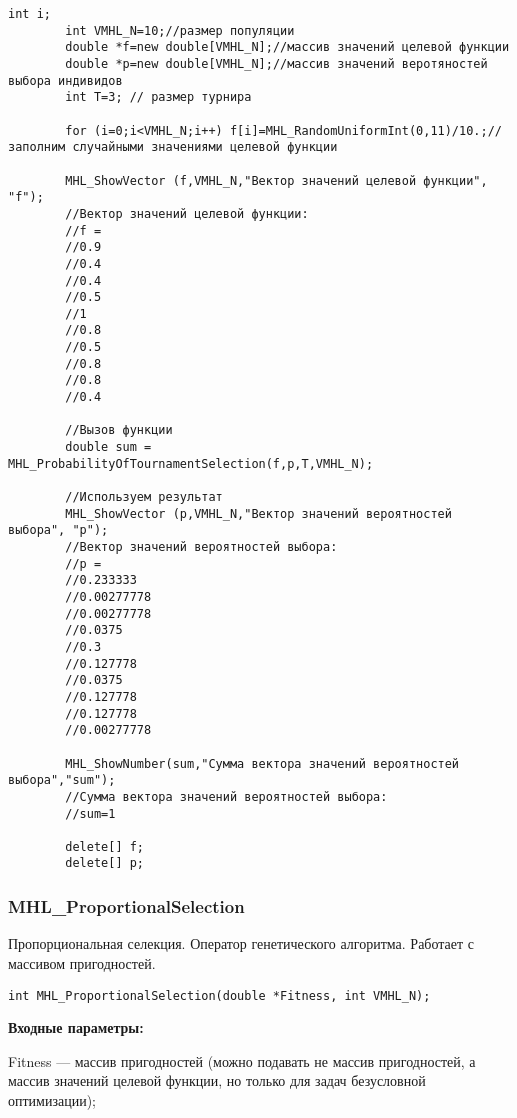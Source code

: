 \documentclass[a4paper,12pt]{article}
\begin{document}
\begin{lstlisting}[label=code_use_MHL_ProbabilityOfTournamentSelection,caption=Пример использования]
        int i;
        int VMHL_N=10;//размер популяции
        double *f=new double[VMHL_N];//массив значений целевой функции
        double *p=new double[VMHL_N];//массив значений веротяностей выбора индивидов
        int T=3; // размер турнира

        for (i=0;i<VMHL_N;i++) f[i]=MHL_RandomUniformInt(0,11)/10.;//заполним случайными значениями целевой функции

        MHL_ShowVector (f,VMHL_N,"Вектор значений целевой функции", "f");
        //Вектор значений целевой функции:
        //f =
        //0.9
        //0.4
        //0.4
        //0.5
        //1
        //0.8
        //0.5
        //0.8
        //0.8
        //0.4

        //Вызов функции
        double sum = MHL_ProbabilityOfTournamentSelection(f,p,T,VMHL_N);

        //Используем результат
        MHL_ShowVector (p,VMHL_N,"Вектор значений вероятностей выбора", "p");
        //Вектор значений вероятностей выбора:
        //p =
        //0.233333
        //0.00277778
        //0.00277778
        //0.0375
        //0.3
        //0.127778
        //0.0375
        //0.127778
        //0.127778
        //0.00277778

        MHL_ShowNumber(sum,"Сумма вектора значений вероятностей выбора","sum");
        //Сумма вектора значений вероятностей выбора:
        //sum=1

        delete[] f;
        delete[] p;
\end{lstlisting}

\subsubsection{MHL\_ProportionalSelection}\label{MHL_ProportionalSelection}

Пропорциональная селекция. Оператор генетического алгоритма. Работает с массивом пригодностей.


\begin{lstlisting}[label=code_syntax_MHL_ProportionalSelection,caption=Синтаксис]
int MHL_ProportionalSelection(double *Fitness, int VMHL_N);
\end{lstlisting}

\textbf{Входные параметры:}
 
 Fitness --- массив пригодностей (можно подавать не массив пригодностей, а массив значений целевой функции, но только для задач безусловной оптимизации);
  
\end{document}
